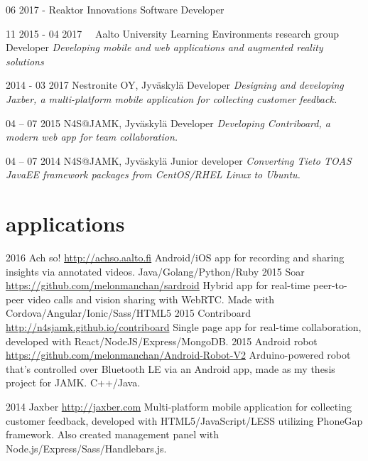 \documentclass[]{friggeri-cv}
\begin{document}
\begin{entrylist}
  \entry
    {06 2017 - }
    {Reaktor Innovations}
    {Software Developer}
    {}

  \entry
    {11 2015 - 04 2017~~}
    {Aalto University Learning Environments research group}
    {Developer}
    {\emph{Developing mobile and web applications and augmented reality solutions}}

  \entry
    {2014 - 03 2017}
    {Nestronite OY, Jyväskylä}
    {Developer}
    {\emph{Designing and developing Jaxber, a multi-platform mobile application for collecting customer feedback.}}

    \entry
    {04 – 07 2015}
    {N4S@JAMK, Jyväskylä}
    {Developer}
    {\emph{Developing Contriboard, a modern web app for team collaboration.}}

  \entry
    {04 – 07 2014}
    {N4S@JAMK, Jyväskylä}
    {Junior developer}
    {\emph{Converting Tieto TOAS JavaEE framework packages from CentOS/RHEL Linux to Ubuntu.}}

\end{entrylist}

\section{applications}

\begin{entrylist}
  \entry
    {2016}
    {Ach so!}
    {\href{http://achso.aalto.fi}{http://achso.aalto.fi}}
    {Android/iOS app for recording and sharing insights via annotated videos. Java/Golang/Python/Ruby}
  \entry
    {2015}
    {Soar}
    {\href{https://github.com/melonmanchan/sardroid}{https://github.com/melonmanchan/sardroid}}
    {Hybrid app for real-time peer-to-peer video calls and vision sharing with WebRTC. Made with Cordova/Angular/Ionic/Sass/HTML5}
  \entry
    {2015}
    {Contriboard}
    {\href{http://n4sjamk.github.io/contriboard/}{http://n4sjamk.github.io/contriboard}}
    {Single page app for real-time collaboration, developed with React/NodeJS/Express/MongoDB.}
  \entry
    {2015}
    {Android robot}
    {\href{https://github.com/melonmanchan/Android-Robot-V2}{https://github.com/melonmanchan/Android-Robot-V2}}
    {Arduino-powered robot that's controlled over Bluetooth LE via an Android app, made as my thesis project for JAMK. C++/Java.}

  \entry
    {2014}
    {Jaxber}
    {\href{http://jaxber.com}{http://jaxber.com}}
    {Multi-platform mobile application for collecting customer feedback, developed with HTML5/JavaScript/LESS utilizing PhoneGap framework. Also created management panel with Node.js/Express/Sass/Handlebars.js.}
\end{entrylist}
\end{document}
